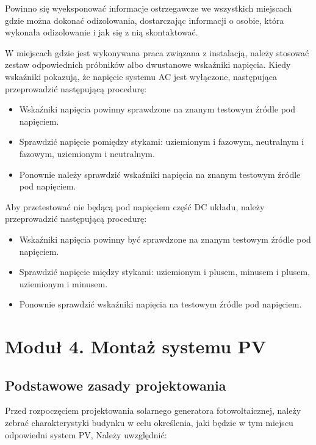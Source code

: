 \documentclass[12pt,a4paper]{article}
\begin{document}
Powinno się wyeksponować informacje ostrzegawcze we wszystkich miejscach 
gdzie można dokonać odizolowania, dostarczając informacji o osobie, 
która wykonała odizolowanie i jak się z nią skontaktować. 

W miejscach gdzie jest wykonywana praca związana z instalacją, należy 
stosować zestaw odpowiednich próbników albo dwustanowe wskaźniki 
napięcia. Kiedy wskaźniki pokazują, że napięcie systemu AC jest 
wyłączone, następująca przeprowadzić następującą procedurę: 

\begin{itemize}
\item Wskaźniki napięcia powinny sprawdzone na znanym testowym źródle 
pod napięciem. 
\item Sprawdzić napięcie pomiędzy stykami: uziemionym i fazowym, neutralnym i fazowym, uziemionym i neutralnym. 
\item Ponownie należy sprawdzić wskaźniki napięcia na znanym testowym źródle 
pod napięciem. 
\end{itemize}
 


Aby przetestować nie będącą pod napięciem część DC układu, należy przeprowadzić następującą procedurę: 

 
\begin{itemize}
\item Wskaźniki napięcia powinny być sprawdzone na znanym testowym źródle pod 
napięciem. 
\item Sprawdzić napięcie między stykami: uziemionym i plusem, minusem i plusem, uziemionym i minusem. 
\item Ponownie sprawdzić wskaźniki napięcia na testowym źródle pod napięciem.
\end{itemize}



\section{Moduł 4. Montaż systemu PV }

\subsection{Podstawowe zasady projektowania}
  

Przed rozpoczęciem projektowania solarnego generatora fotowoltaicznej, 
należy zebrać charakterystyki budynku w celu określenia, jaki będzie w 
tym miejscu odpowiedni system PV, Należy uwzględnić: 
\end{document}
